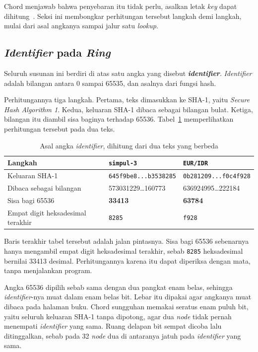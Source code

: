 Chord menjawab bahwa penyebaran itu tidak perlu, asalkan letak
\textit{key} dapat
dihitung~\cite{stoica2001chord}. Seksi ini membongkar perhitungan tersebut
langkah demi langkah, mulai dari asal angkanya sampai jalur satu
\textit{lookup}.

\subsection{\textit{Identifier} pada \textit{Ring}}

Seluruh susunan ini berdiri di atas satu angka yang disebut \textbf{\textit{identifier}}.
\textit{Identifier} adalah bilangan antara 0 sampai 65535, dan asalnya dari fungsi hash.

Perhitungannya tiga langkah. Pertama, teks dimasukkan ke SHA-1, yaitu
\textit{Secure Hash Algorithm 1}. Kedua, keluaran SHA-1 dibaca sebagai bilangan
bulat. Ketiga, bilangan itu diambil sisa baginya terhadap 65536.
Tabel~\ref{tab:asal-titik} memperlihatkan perhitungan tersebut pada dua teks.

\begin{table}[htbp]
  \centering
  \caption{Asal angka \textit{identifier}, dihitung dari dua teks yang berbeda}
  \label{tab:asal-titik}
  \begin{tabularx}{\textwidth}{|l|X|X|}
    \hline
    \textbf{Langkah} & \textbf{\texttt{simpul-3}} & \textbf{\texttt{EUR/IDR}} \\
    \hline
    Keluaran SHA-1 & \texttt{645f9be8...b3538285} & \texttt{0b281209...f0c4f928} \\
    \hline
    Dibaca sebagai bilangan & 573031229\dots 160773 & 636924995\dots 222184 \\
    \hline
    Sisa bagi 65536 & \textbf{33413} & \textbf{63784} \\
    \hline
    Empat digit heksadesimal terakhir & \texttt{8285} & \texttt{f928} \\
    \hline
  \end{tabularx}
\end{table}

Baris terakhir tabel tersebut adalah jalan pintasnya. Sisa bagi 65536 sebenarnya
hanya mengambil empat digit heksadesimal terakhir, sebab \texttt{8285}
heksadesimal bernilai 33413 desimal. Perhitungannya karena itu dapat diperiksa
dengan mata, tanpa menjalankan program.

Angka 65536 dipilih sebab sama dengan dua pangkat enam belas, sehingga \textit{identifier}-nya
muat dalam enam belas bit. Lebar itu dipakai agar angkanya muat dibaca pada
halaman buku. Chord sungguhan memakai seratus enam puluh bit, yaitu seluruh
keluaran SHA-1 tanpa dipotong, agar dua \textit{node} tidak pernah menempati
\textit{identifier} yang sama. Ruang delapan bit sempat dicoba lalu ditinggalkan, sebab pada
32 \textit{node} dua di antaranya jatuh pada \textit{identifier} yang sama.

